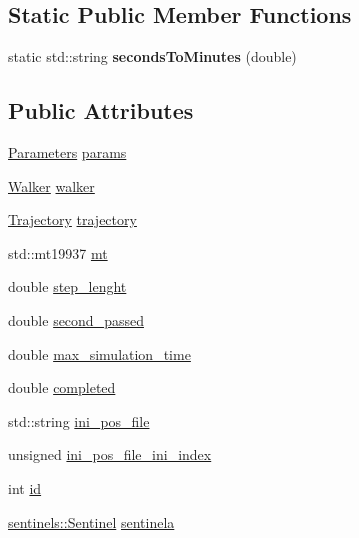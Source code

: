 \subsection*{Static Public Member Functions}
\begin{DoxyCompactItemize}
\item 
\mbox{\label{class_dynamics_simulation_abe4af37db2602b6341b2d7732e43951e}} 
static std\+::string {\bfseries seconds\+To\+Minutes} (double)
\end{DoxyCompactItemize}
\subsection*{Public Attributes}
\begin{DoxyCompactItemize}
\item 
\hyperlink{class_parameters}{Parameters} \hyperlink{class_dynamics_simulation_a67cd4cd9a2e7cd2339c98dae60e66dde}{params}
\item 
\hyperlink{class_walker}{Walker} \hyperlink{class_dynamics_simulation_a9a5d2596527abdcdd185430c97dea9ad}{walker}
\item 
\hyperlink{class_trajectory}{Trajectory} \hyperlink{class_dynamics_simulation_ab69fedf7129784621eec440ba873218d}{trajectory}
\item 
std\+::mt19937 \hyperlink{class_dynamics_simulation_a03ba104f00ae772e9b8fb55e7878c793}{mt}
\item 
double \hyperlink{class_dynamics_simulation_ad6dddce1d5bc30d3e61dceb69652c893}{step\+\_\+lenght}
\item 
double \hyperlink{class_dynamics_simulation_a46187e70aad2b130249ba3d1dd6a3c75}{second\+\_\+passed}
\item 
double \hyperlink{class_dynamics_simulation_a337972272af798cb8606796116145d11}{max\+\_\+simulation\+\_\+time}
\item 
double \hyperlink{class_dynamics_simulation_a6a210fb28fe2f996c226614742a25214}{completed}
\item 
std\+::string \hyperlink{class_dynamics_simulation_a4fb0e535753c48b4a2647502379aebaf}{ini\+\_\+pos\+\_\+file}
\item 
unsigned \hyperlink{class_dynamics_simulation_a8e20cd71b55dda041844cfc305851dbe}{ini\+\_\+pos\+\_\+file\+\_\+ini\+\_\+index}
\item 
int \hyperlink{class_dynamics_simulation_aa178498c8be8af1a515a8c0a02187600}{id}
\item 
\hyperlink{classsentinels_1_1_sentinel}{sentinels\+::\+Sentinel} \hyperlink{class_dynamics_simulation_aed384434dc469e766301268dcf1ec4ab}{sentinela}

\end{DoxyCompactItemize}
